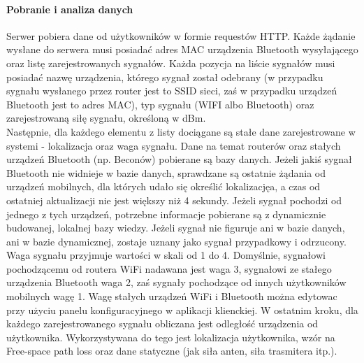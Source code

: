 \documentclass{article}
\begin{document}
		\paragraph{Pobranie i analiza danych}
		Serwer pobiera dane od użytkowników w formie requestów HTTP. Każde żądanie wysłane do serwera musi posiadać adres MAC urządzenia Bluetooth wysyłającego oraz listę zarejestrowanych sygnałów. Każda pozycja na liście sygnałów musi posiadać nazwę urządzenia, którego sygnał został odebrany (w przypadku sygnału wysłanego przez router jest to SSID sieci, zaś w przypadku urządzeń Bluetooth jest to adres MAC), typ sygnału (WIFI albo Bluetooth) oraz zarejestrowaną siłę sygnału, określoną w dBm. \\
		Następnie, dla każdego elementu z listy dociągane są stałe dane zarejestrowane w systemi - lokalizacja oraz waga sygnału. Dane na temat routerów oraz stałych urządzeń Bluetooth (np. Beconów) pobierane są bazy danych. Jeżeli jakiś sygnał Bluetooth nie widnieje w bazie danych, sprawdzane są ostatnie żądania od urządzeń mobilnych, dla których udało się określić lokalizacjęa, a czas od ostatniej aktualizacji nie jest większy niż 4 sekundy. Jeżeli sygnał pochodzi od jednego z tych urządzeń, potrzebne informacje pobierane są z dynamicznie budowanej, lokalnej bazy wiedzy. Jeżeli sygnał nie figuruje ani w bazie danych, ani w bazie dynamicznej, zostaje uznany jako sygnał przypadkowy i odrzucony. Waga sygnału przyjmuje wartości w skali od 1 do 4. Domyślnie, sygnałowi pochodzącemu od routera WiFi nadawana jest waga 3, sygnałowi ze stałego urządzenia Bluetooth waga 2, zaś sygnały pochodzące od innych użytkowników mobilnych wagę 1. Wagę stałych urządzeń WiFi i Bluetooth można edytowac przy użyciu panelu konfiguracyjnego w aplikacji klienckiej. W ostatnim kroku, dla każdego zarejestrowanego sygnału obliczana jest odległość urządzenia od użytkownika. Wykorzystywana do tego jest lokalizacja użytkownika, wzór na Free-space path loss oraz dane statyczne (jak siła anten, siła trasmitera itp.).\\
\end{document}
